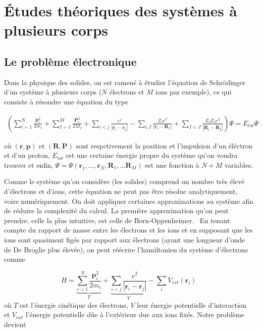 \chapter{Études théoriques des systèmes à plusieurs corps}
\section{Le problème électronique}
Dans la physique des solides, on est ramené à étudier l'équation de Schrödinger d'un système à plusieurs corps ($N$ électrons et $M$ ions par exemple), ce qui consiste à résoudre une équation du type

\begin{equation}
\begin{split}
(\sum_{i=1}^N \frac{\textbf{p}_i^2}{2m_i} + \sum_{I=1}^M \frac{\textbf{P}_i^2}{2M_I}
+ \sum_{i<j}\frac{e^2}{| \textbf{r}_i - \textbf{r}_j |} - \sum_{i, I}\frac{Z_I e^2}{| \textbf{r}_i
- \textbf{R}_I |} + \sum_{I<J}\frac{Z_I Z_J e^2}{| \textbf{R}_i - \textbf{R}_j |} ) \Psi = E_{tot} \Psi
\end{split}
\end{equation}

où $(\textbf{r}, \textbf{p})$ et $(\textbf{R}, \textbf{P})$ sont respctivement la position et l'impulsion d'un éléctron et d'un proton, $E_{tot}$ est une certaine énergie propre du système qu'on voudra trouver et enfin, $\Psi = \Psi(\textbf{r}_1, \ldots, \textbf{r}_N,  \textbf{R}_1, \ldots \textbf{R}_M)$ est une fonction à $N+M $ variables.

Comme le système qu'on considère (les solides) comprend un nombre très élevé d'électrons et d'ions, cette équation ne peut pas être résolue analytiquement, voire numériquement. On doit appliquer certaines approximations au système afin de réduire la complexité du calcul. La première approximation qu'on peut prendre, celle la plus intuitive, est celle de Born-Oppenheimer.~\cite{Born1927}
En tenant compte du rapport de masse entre les électrons et les ions et en supposant que les ions sont quasiment figés par rapport aux électrons (ayant une longueur d'onde de De Broglie plus élevée), on peut réécrire l'hamiltonien du système d'électrons comme

$$
H = \underbrace{\sum_{i=1}^N \frac{\textbf{p}_i^2}{2m_i}}_{T}
+ \underbrace{\sum_{i<j}\frac{e^2}{| \textbf{r}_i - \textbf{r}_j |}}_{V}
- \sum_i V_{ext}(\textbf{r}_i)
$$
où $T$ est l'énergie cinétique des électrons, $V$ leur énergie potentielle d'interaction et $V_{ext}$ l'énergie potentielle dûe à l'extérieur due aux ions fixés.
Notre problème devient

